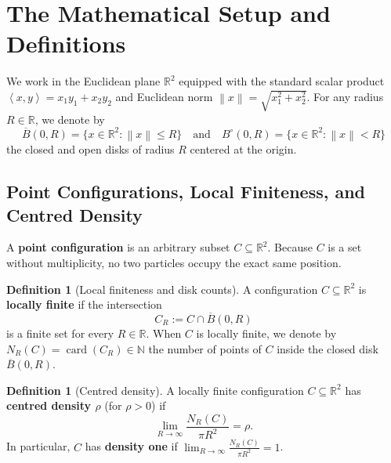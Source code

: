 \documentclass[11pt, a4paper]{article}
\theoremstyle{definition}
\newtheorem{definition}[theorem]{Definition}
\theoremstyle{remark}
\newcommand{\R}{\mathbb{R}}
\newcommand{\N}{\mathbb{N}}
\newcommand{\Bbar}{\overline{B}}
\newcommand{\Bopen}{B^{\circ}}
\newcommand{\norm}[1]{\left\lVert #1 \right\rVert}
\newcommand{\inner}[2]{\left\langle #1, #2 \right\rangle}
\begin{document}
\section{The Mathematical Setup and Definitions}
\label{sec:setup}

We work in the Euclidean plane $\R^2$ equipped with the standard scalar product $\inner{x}{y} = x_1 y_1 + x_2 y_2$ and Euclidean norm $\norm{x} = \sqrt{x_1^2 + x_2^2}$. For any radius $R \in \R$, we denote by
\[
\Bbar(0, R) = \{x \in \R^2 : \norm{x} \le R\} \quad \text{and} \quad \Bopen(0, R) = \{x \in \R^2 : \norm{x} < R\}
\]
the closed and open disks of radius $R$ centered at the origin.

\subsection{Point Configurations, Local Finiteness, and Centred Density}

A \textbf{point configuration} is an arbitrary subset $C \subseteq \R^2$. Because $C$ is a set without multiplicity, no two particles occupy the exact same position.

\begin{definition}[Local finiteness and disk counts]
A configuration $C \subseteq \R^2$ is \textbf{locally finite} if the intersection
\[
C_R := C \cap \Bbar(0, R)
\]
is a finite set for every $R \in \R$. When $C$ is locally finite, we denote by $N_R(C) = \operatorname{card}(C_R) \in \N$ the number of points of $C$ inside the closed disk $\Bbar(0, R)$.
\end{definition}

\begin{definition}[Centred density]
\label{def:density}
A locally finite configuration $C \subseteq \R^2$ has \textbf{centred density $\rho$} (for $\rho > 0$) if
\[
\lim_{R \to \infty} \frac{N_R(C)}{\pi R^2} = \rho.
\]
In particular, $C$ has \textbf{density one} if $\lim_{R \to \infty} \frac{N_R(C)}{\pi R^2} = 1$.
\end{definition}
\end{document}

